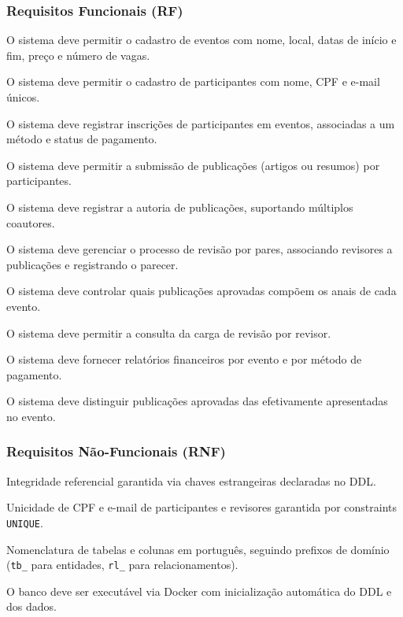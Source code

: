 \documentclass[12pt]{article}
\begin{document}
\subsubsection{Requisitos Funcionais (RF)}
\begin{description}[leftmargin=2.5cm,style=nextline]
    \item[\textbf{RF01}] O sistema deve permitir o cadastro de eventos com nome, local, datas de início e fim, preço e número de vagas.
    \item[\textbf{RF02}] O sistema deve permitir o cadastro de participantes com nome, CPF e e-mail únicos.
    \item[\textbf{RF03}] O sistema deve registrar inscrições de participantes em eventos, associadas a um método e status de pagamento.
    \item[\textbf{RF04}] O sistema deve permitir a submissão de publicações (artigos ou resumos) por participantes.
    \item[\textbf{RF05}] O sistema deve registrar a autoria de publicações, suportando múltiplos coautores.
    \item[\textbf{RF06}] O sistema deve gerenciar o processo de revisão por pares, associando revisores a publicações e registrando o parecer.
    \item[\textbf{RF07}] O sistema deve controlar quais publicações aprovadas compõem os anais de cada evento.
    \item[\textbf{RF08}] O sistema deve permitir a consulta da carga de revisão por revisor.
    \item[\textbf{RF09}] O sistema deve fornecer relatórios financeiros por evento e por método de pagamento.
    \item[\textbf{RF10}] O sistema deve distinguir publicações aprovadas das efetivamente apresentadas no evento.
\end{description}

\subsubsection{Requisitos Não-Funcionais (RNF)}
\begin{description}[leftmargin=2.5cm,style=nextline]
    \item[\textbf{RNF01}] Integridade referencial garantida via chaves estrangeiras declaradas no DDL.
    \item[\textbf{RNF02}] Unicidade de CPF e e-mail de participantes e revisores garantida por constraints \texttt{UNIQUE}.
    \item[\textbf{RNF03}] Nomenclatura de tabelas e colunas em português, seguindo prefixos de domínio (\texttt{tb\_} para entidades, \texttt{rl\_} para relacionamentos).
    \item[\textbf{RNF04}] O banco deve ser executável via Docker com inicialização automática do DDL e dos dados.
\end{description}
\end{document}
